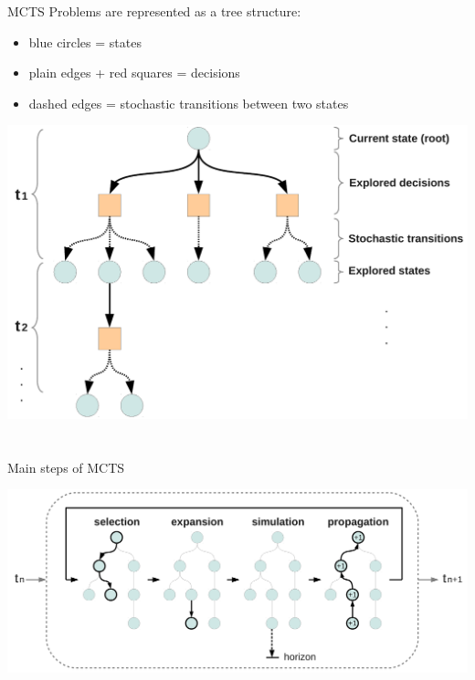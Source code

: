 \begin{frame}{MCTS}
    Problems are represented as a tree structure:
    \begin{itemize}
        \item blue circles = states
        \item plain edges + red squares = decisions
        \item dashed edges = stochastic transitions between two states
    \end{itemize}
    \begin{center}
        \includegraphics[width=.65\linewidth]{figs/tree}
    \end{center}
\end{frame}


\section{\mcts{}}
\subsection{\mcts}

\begin{frame}{Main steps of MCTS}
    \begin{center}
        \includegraphics[width=.99\linewidth]{figs/tree9}
    \end{center}
\end{frame}


